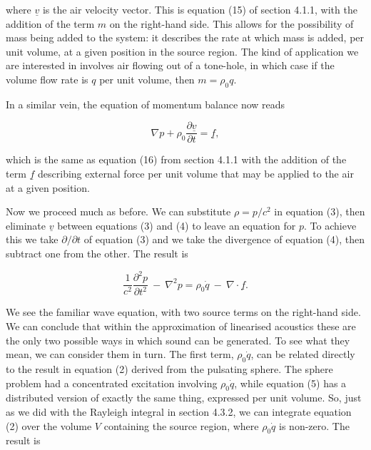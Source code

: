   \noindent{}where $\underline{v}$ is the air velocity vector. This is equation 
  (15) of section 4.1.1, with the addition of the term $m$ on the right-hand 
  side. This allows for the possibility of mass being added to the system: it 
  describes the rate at which mass is added, per unit volume, at a given 
  position in the source region. The kind of application we are interested in 
  involves air flowing out of a tone-hole, in which case if the volume flow 
  rate is $q$ per unit volume, then $m=\rho_0 q$. 

  In a similar vein, the equation of momentum balance now reads 

  \begin{equation*}\nabla p + \rho_0 \dfrac{\partial \underline{v}}{\partial t} 
  = \underline{f} , \tag{4}\end{equation*} 

  \noindent{}which is the same as equation (16) from section 4.1.1 with the 
  addition of the term $\underline{f}$ describing external force per unit 
  volume that may be applied to the air at a given position. 

  Now we proceed much as before. We can substitute $\rho = p/c^2$ in equation 
  (3), then eliminate $\underline{v}$ between equations (3) and (4) to leave an 
  equation for $p$. To achieve this we take $\partial/\partial t$ of equation 
  (3) and we take the divergence of equation (4), then subtract one from the 
  other. The result is 

  \begin{equation*}\dfrac{1}{c^2} \dfrac{\partial^2 p}{\partial t^2} 
  \mathrm{~}-\mathrm{~} \nabla^2 p = \rho_0 \dot{q} \mathrm{~}-\mathrm{~} 
  \nabla \cdot \underline{f} .\tag{5}\end{equation*} 

  We see the familiar wave equation, with two source terms on the right-hand 
  side. We can conclude that within the approximation of linearised acoustics 
  these are the only two possible ways in which sound can be generated. To see 
  what they mean, we can consider them in turn. The first term, $\rho_0 
  \dot{q}$, can be related directly to the result in equation (2) derived from 
  the pulsating sphere. The sphere problem had a concentrated excitation 
  involving $\rho_0 \dot{q}$, while equation (5) has a distributed version of 
  exactly the same thing, expressed per unit volume. So, just as we did with 
  the Rayleigh integral in section 4.3.2, we can integrate equation (2) over 
  the volume $V$ containing the source region, where $\rho_0 \dot{q}$ is 
  non-zero. The result is 

